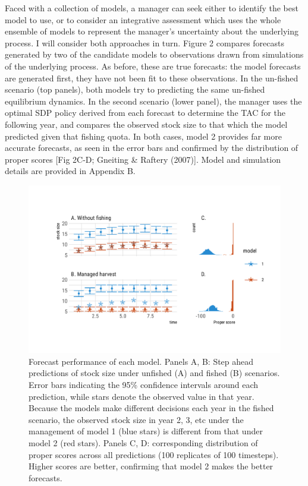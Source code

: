 \documentclass[3p]{elsarticle} %
\begin{document}
Faced with a collection of models, a manager can seek either to identify
the best model to use, or to consider an integrative assessment which
uses the whole ensemble of models to represent the manager's uncertainty
about the underlying process. I will consider both approaches in turn.
Figure 2 compares forecasts generated by two of the candidate models to
observations drawn from simulations of the underlying process. As
before, these are true forecasts: the model forecasts are generated
first, they have not been fit to these observations. In the un-fished
scenario (top panels), both models try to predicting the same un-fished
equilibrium dynamics. In the second scenario (lower panel), the manager
uses the optimal SDP policy derived from each forecast to determine the
TAC for the following year, and compares the observed stock size to that
which the model predicted given that fishing quota. In both cases, model
2 provides far more accurate forecasts, as seen in the error bars and
confirmed by the distribution of proper scores {[}Fig 2C-D; Gneiting \&
Raftery (2007){]}. Model and simulation details are provided in Appendix
B.

\begin{figure}
\centering
\includegraphics{manuscript_files/figure-latex/figure2-1.pdf}
\caption{Forecast performance of each model. Panels A, B: Step ahead
predictions of stock size under unfished (A) and fished (B) scenarios.
Error bars indicating the 95\% confidence intervals around each
prediction, while stars denote the observed value in that year. Because
the models make different decisions each year in the fished scenario,
the observed stock size in year 2, 3, etc under the management of model
1 (blue stars) is different from that under model 2 (red stars). Panels
C, D: corresponding distribution of proper scores across all predictions
(100 replicates of 100 timesteps). Higher scores are better, confirming
that model 2 makes the better forecasts.}
\end{figure}
\end{document}
